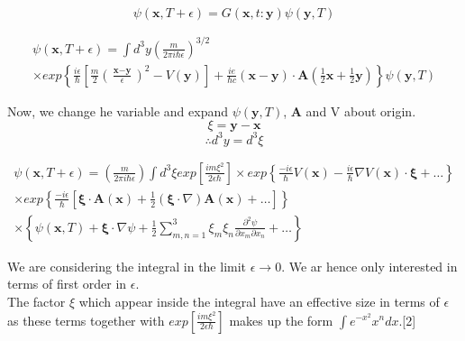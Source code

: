 \documentclass[14pt]{extarticle}
\begin{document}
$$\psi(\textbf{x},T+\epsilon) = G(\textbf{x},t:\textbf{y}) \psi(\textbf{y},T)$$


\begin{multline}
 \psi(\textbf{x},T+\epsilon) =  \int d^3 y \left( \frac{m}{2 \pi i \hbar \epsilon} \right)^{3/2} \nonumber \\ \times exp \left\lbrace \frac{i\epsilon}{\hbar} \left[ \frac{m}{2} \left( \frac{\textbf{x}-\textbf{y}}{\epsilon} \right)^2 -V(\textbf{y}) \right] + \frac{ie}{\hbar c} (\textbf{x}-\textbf{y}) \cdot \textbf{A} \left( \frac{1}{2} \textbf{x} + \frac{1}{2} \textbf{y} \right)  \right\rbrace \psi(\textbf{y},T) \nonumber 
\end{multline}


Now, we change he variable and expand $\psi(\textbf{y},T)$, $\textbf{A}$ and V about origin.
$$\textbf{$\xi$} = \textbf{y} - \textbf{x}  $$
$$\therefore d^3y=d^3 \xi$$









\begin{multline}
\psi(\textbf{x},T+\epsilon) =\left( \frac{m}{2 \pi i \hbar \epsilon} \right) \int d^3 \xi exp{\left[ \frac{im \xi^2}{2 \epsilon \hbar} \right]} \times  exp \left\lbrace \frac{-i \epsilon}{\hbar} V(\textbf{x}) - \frac{i \epsilon}{\hbar} \nabla V(\textbf{x}) \cdot  \boldsymbol{\xi}  + \dots \right\rbrace \\ 
\times exp \left\lbrace \frac{-i \epsilon}{\hbar} \left[ \boldsymbol{\xi} \cdot \textbf{A}(\textbf{x}) + \frac{1}{2} (\boldsymbol{\xi} \cdot \nabla) \textbf{A}(\textbf{x})+ \dots \right]  \right\rbrace \nonumber \\ \times  \left\lbrace \psi(\textbf{x},T) + \boldsymbol{\xi} \cdot \nabla \psi + \frac{1}{2} \sum_{m,n=1}^3 \xi_m \xi_n \frac{\partial^2 \psi}{\partial x_m \partial x_n} + \dots \right\rbrace
\end{multline}












We are considering the integral in the limit $\epsilon \rightarrow 0$. We ar hence only interested in terms of first order in $\epsilon$.\\

The factor $\xi$ which appear inside the integral have an effective size in terms of $\epsilon$ as these terms together with $exp[\frac{im \xi^2}{2 \epsilon \hbar}]$ makes up the form $\int e^{-x^2} x^n dx$.[2]\\
\end{document}

